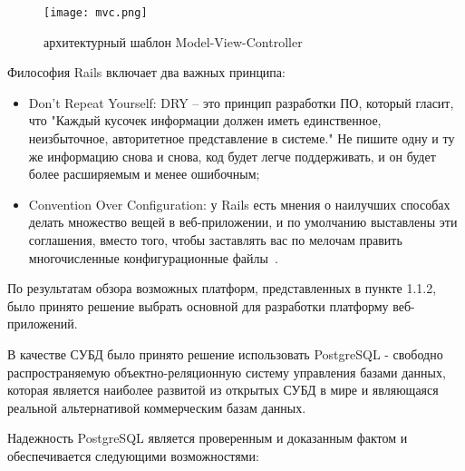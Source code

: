 \begin{figure}[!h]
	\centering
	\texttt{[image: mvc.png]} 
	\caption{архитектурный шаблон Model-View-Controller}
	\label{fig:analysis:specification:language:mvc}
\end{figure}

Философия Rails включает два важных принципа:

\begin{itemize}
	\item Don't Repeat Yourself: DRY -- это принцип разработки ПО, который гласит, что "Каждый кусочек информации должен
	иметь единственное, неизбыточное, авторитетное представление в системе." Не пишите одну и ту же информацию снова и
	снова, код будет легче поддерживать, и он будет более расширяемым и менее ошибочным;
	\item Convention Over Configuration: у Rails есть мнения о наилучших способах делать множество вещей в веб-приложении,
	и по умолчанию выставлены эти соглашения, вместо того, чтобы заставлять вас по мелочам править многочисленные
	конфигурационные файлы~\cite{rails}.
\end{itemize}

По результатам обзора возможных платформ, представленных в пункте 1.1.2, было принято решение выбрать основной для
разработки платформу веб-приложений.

В качестве СУБД было принято решение использовать PostgreSQL - свободно распространяемую объектно-реляционную систему
управления базами данных, которая является наиболее развитой из открытых СУБД в мире и являющаяся реальной
альтернативой коммерческим базам данных.

Надежность PostgreSQL является проверенным и доказанным фактом и обеспечивается следующими возможностями:

